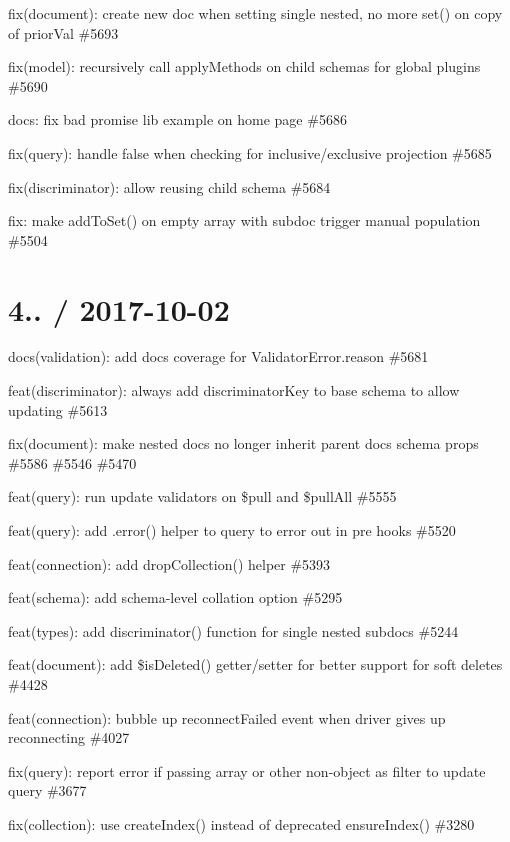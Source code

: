 \begin{DoxyItemize}
\item fix(document)\+: create new doc when setting single nested, no more set() on copy of prior\+Val \#5693
\item fix(model)\+: recursively call apply\+Methods on child schemas for global plugins \#5690
\item docs\+: fix bad promise lib example on home page \#5686
\item fix(query)\+: handle false when checking for inclusive/exclusive projection \#5685
\item fix(discriminator)\+: allow reusing child schema \#5684
\item fix\+: make add\+To\+Set() on empty array with subdoc trigger manual population \#5504
\end{DoxyItemize}

\section*{4.. / 2017-\/10-\/02 }


\begin{DoxyItemize}
\item docs(validation)\+: add docs coverage for Validator\+Error.\+reason \#5681
\item feat(discriminator)\+: always add discriminator\+Key to base schema to allow updating \#5613
\item fix(document)\+: make nested docs no longer inherit parent doc\textquotesingle{}s schema props \#5586 \#5546 \#5470
\item feat(query)\+: run update validators on \$pull and \$pull\+All \#5555
\item feat(query)\+: add .error() helper to query to error out in pre hooks \#5520
\item feat(connection)\+: add drop\+Collection() helper \#5393
\item feat(schema)\+: add schema-\/level collation option \#5295
\item feat(types)\+: add {\ttfamily discriminator()} function for single nested subdocs \#5244
\item feat(document)\+: add \$is\+Deleted() getter/setter for better support for soft deletes \#4428
\item feat(connection)\+: bubble up reconnect\+Failed event when driver gives up reconnecting \#4027
\item fix(query)\+: report error if passing array or other non-\/object as filter to update query \#3677
\item fix(collection)\+: use create\+Index() instead of deprecated ensure\+Index() \#3280
\end{DoxyItemize}

